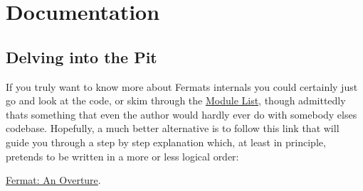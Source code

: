 \hypertarget{index_FermatDocumentationSection}{}\section{Documentation}\label{index_FermatDocumentationSection}
\hypertarget{index_FermatDelivingIntoThePitSection}{}\subsection{Delving into the Pit}\label{index_FermatDelivingIntoThePitSection}
\begin{DoxyParagraph}{}
If you truly want to know more about Fermat\textquotesingle{}s internals you could certainly just go and look at the code, or skim through the \hyperlink{_modules_page}{Module List}, though admittedly that\textquotesingle{}s something that even the author would hardly ever do with somebody else\textquotesingle{}s codebase. Hopefully, a much better alternative is to follow this link that will guide you through a step by step explanation which, at least in principle, pretends to be written in a more or less logical order\+: 
\end{DoxyParagraph}
\begin{DoxyParagraph}{}
\hyperlink{_overture_contents_page}{Fermat\+: An Overture}. 
\end{DoxyParagraph}
